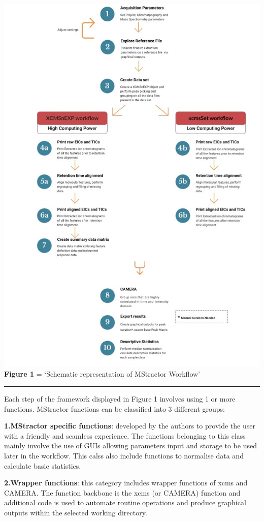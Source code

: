 \documentclass[
]{article}
\begin{document}
\includegraphics{./workflow.jpg} \textbf{Figure 1} = `Schematic
representation of MStractor Workflow'

\begin{center}\rule{0.5\linewidth}{0.5pt}\end{center}

Each step of the framework displayed in Figure 1 involves using 1 or
more functions. MStractor functions can be classified into 3 different
groups:

\textbf{1.MStractor specific functions}: developed by the authors to
provide the user with a friendly and seamless experience. The functions
belonging to this class mainly involve the use of GUIs allowing
parameters input and storage to be used later in the workflow. This
calss also include functions to normalise data and calculate basic
statistics.

\textbf{2.Wrapper functions}: this category includes wrapper functions
of xcms and CAMERA. The function backbone is the xcms (or CAMERA)
function and additional code is used to automate routine operations and
produce graphical outputs within the selected working directory.
\end{document}
